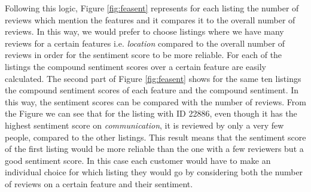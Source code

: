 Following this logic, Figure \ref{fig:feasent} represents for each listing the number of reviews which mention the features and it compares it to the overall number of reviews. In this way, we would prefer to choose listings where we have many reviews for a certain features i.e. \textit{location} compared to the overall number of reviews in order for the sentiment score to be more reliable.  %
For each of the listings the compound sentiment scores over a certain feature are easily calculated. The second part of Figure \ref{fig:feasent} shows for the same ten listings the compound sentiment scores of each feature and the compound sentiment. In this way, the sentiment scores can be compared with the number of reviews. From the Figure we can see that for the listing with ID 22886, even though it has the highest sentiment score on \textit{communication}, it is reviewed by only a very few people, compared to the other listings. This result means that the sentiment score of the first listing would be more reliable than the one with a few reviewers but a good sentiment score. In this case each customer would have to make an individual choice for which listing they would go by considering both the number of reviews on a certain feature and their sentiment. 

